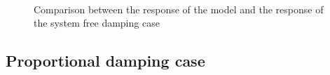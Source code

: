\begin{figure}[h]
\centering
		\\
		\\
		\\
	\caption{Comparison between the response of the model and the response of the 
	system free damping case}
	\label{fig:freedampingcase}
\end{figure}
%
\clearpage
%
\subsection{Proportional damping case}
\label{subsec:proportionaldamping}

